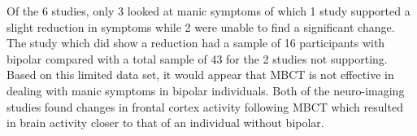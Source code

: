 Of the 6 studies, only 3 looked at manic symptoms of which 1 study supported a slight reduction in symptoms while 2 were unable to find a significant change. The study which did show a reduction had a sample of 16 participants with bipolar compared with a total sample of 43 for the 2 studies not supporting. Based on this limited data set, it would appear that MBCT is not effective in dealing with manic symptoms in bipolar individuals. Both of the neuro-imaging studies found changes in frontal cortex activity following MBCT which resulted in brain activity closer to that of an individual without bipolar.